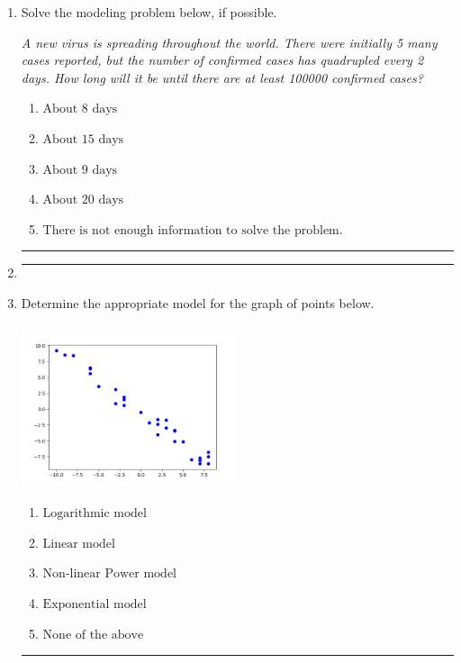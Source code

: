 \documentclass[14pt]{extbook}
\newcommand{\litem}[1]{\item#1\hspace*{-1cm}\rule{\textwidth}{0.4pt}}
\begin{document}
\begin{enumerate}
{\begin{enumerate}[label=\Alph*.]
\end{enumerate} }
\litem{
Solve the modeling problem below, if possible.
\begin{center}
    \textit{ A new virus is spreading throughout the world. There were initially 5 many cases reported, but the number of confirmed cases has quadrupled every 2 days. How long will it be until there are at least 100000 confirmed cases? }
\end{center}
\begin{enumerate}[label=\Alph*.]
\item \( \text{About } 8 \text{ days} \)
\item \( \text{About } 15 \text{ days} \)
\item \( \text{About } 9 \text{ days} \)
\item \( \text{About } 20 \text{ days} \)
\item \( \text{There is not enough information to solve the problem.} \)

\end{enumerate} }
\litem{
\begin{enumerate}[label=\Alph*.]

\end{enumerate} }
\litem{
Determine the appropriate model for the graph of points below.
\begin{center}
    \includegraphics[width=0.5\textwidth]{../Figures/identifyModelGraph12C.png}
\end{center}
\begin{enumerate}[label=\Alph*.]
\item \( \text{Logarithmic model} \)
\item \( \text{Linear model} \)
\item \( \text{Non-linear Power model} \)
\item \( \text{Exponential model} \)
\item \( \text{None of the above} \)


\end{enumerate}}
\end{enumerate}
\end{document}
